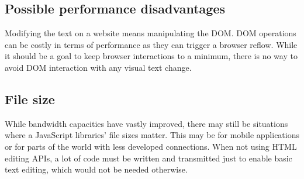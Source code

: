 
\subsection{Possible performance disadvantages}

Modifying the text on a website means manipulating the DOM. DOM operations can be costly in terms of performance as they can trigger a browser reflow\cite{br}. While it should be a goal to keep browser interactions to a minimum, there is no way to avoid DOM interaction with any visual text change.



\subsection{File size} While bandwidth capacities have vastly improved, there may still be situations where a JavaScript libraries' file sizes matter. This may be for mobile applications or for parts of the world with less developed connections. When not using HTML editing APIs, a lot of code must be written and transmitted just to enable basic text editing, which would not be needed otherwise.